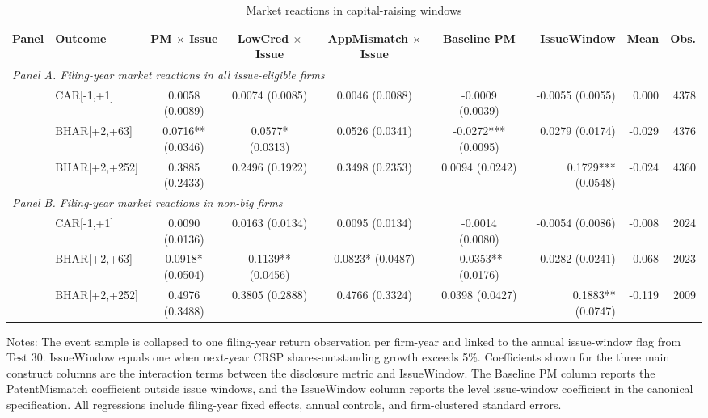 \begin{table}[!htbp]
\centering
\caption{Market reactions in capital-raising windows}
\label{tab:issue_window_market_v32}
\small
\begin{tabular}{llccccrrr}
\hline
Panel & Outcome & PM $\times$ Issue & LowCred $\times$ Issue & AppMismatch $\times$ Issue & Baseline PM & IssueWindow & Mean & Obs. \\
\hline
\multicolumn{9}{l}{\textit{Panel A. Filing-year market reactions in all issue-eligible firms}} \\
 & CAR[-1,+1] & 0.0058 (0.0089) & 0.0074 (0.0085) & 0.0046 (0.0088) & -0.0009 (0.0039) & -0.0055 (0.0055) & 0.000 & 4378 \\
 & BHAR[+2,+63] & 0.0716** (0.0346) & 0.0577* (0.0313) & 0.0526 (0.0341) & -0.0272*** (0.0095) & 0.0279 (0.0174) & -0.029 & 4376 \\
 & BHAR[+2,+252] & 0.3885 (0.2433) & 0.2496 (0.1922) & 0.3498 (0.2353) & 0.0094 (0.0242) & 0.1729*** (0.0548) & -0.024 & 4360 \\
\multicolumn{9}{l}{\textit{Panel B. Filing-year market reactions in non-big firms}} \\
 & CAR[-1,+1] & 0.0090 (0.0136) & 0.0163 (0.0134) & 0.0095 (0.0134) & -0.0014 (0.0080) & -0.0054 (0.0086) & -0.008 & 2024 \\
 & BHAR[+2,+63] & 0.0918* (0.0504) & 0.1139** (0.0456) & 0.0823* (0.0487) & -0.0353** (0.0176) & 0.0282 (0.0241) & -0.068 & 2023 \\
 & BHAR[+2,+252] & 0.4976 (0.3488) & 0.3805 (0.2888) & 0.4766 (0.3324) & 0.0398 (0.0427) & 0.1883** (0.0747) & -0.119 & 2009 \\
\hline
\end{tabular}
\begin{flushleft}
\footnotesize Notes: The event sample is collapsed to one filing-year return observation per firm-year and linked to the annual issue-window flag from Test 30. IssueWindow equals one when next-year CRSP shares-outstanding growth exceeds 5\%. Coefficients shown for the three main construct columns are the interaction terms between the disclosure metric and IssueWindow. The Baseline PM column reports the PatentMismatch coefficient outside issue windows, and the IssueWindow column reports the level issue-window coefficient in the canonical specification. All regressions include filing-year fixed effects, annual controls, and firm-clustered standard errors.
\end{flushleft}
\end{table}
